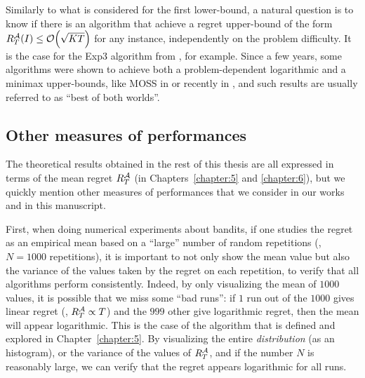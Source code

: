 Similarly to what is considered for the first lower-bound,
a natural question is to know if there is an algorithm that achieve a regret upper-bound of the form $R_T^{\mathcal{A}}(I) \leq \mathop{}\mathopen{}\mathcal{O}\mathopen{}\left(\sqrt{K T}\right)$ for any instance, independently on the problem difficulty.
It is the case for the Exp3 algorithm from \cite{Auer02}, for example.
Since a few years, some algorithms were shown to achieve both a problem-dependent logarithmic and a minimax upper-bounds,
like MOSS in \cite{Audibert2009minimax} or recently \KLUCBpp{} in \cite{Menard17},
and such results are usually referred to as ``best of both worlds''.





\subsection{Other measures of performances}
\label{sub:2:otherMeasuresPerformance}

The theoretical results obtained in the rest of this thesis are all expressed in terms of the mean regret $R_T^{\mathcal{A}}$ (in Chapters~\ref{chapter:5} and \ref{chapter:6}), but we quickly mention other measures of performances that we consider in our works and in this manuscript.

First, when doing numerical experiments about bandits, if one studies the regret as an empirical mean based on a ``large'' number of random repetitions (\eg, $N=1000$ repetitions), it is important to not only show the mean value but also the variance of the values taken by the regret on each repetition, to verify that all algorithms perform consistently.
Indeed, by only visualizing the mean of $1000$ values, it is possible that we miss some ``bad runs'': if $1$ run out of the $1000$ gives linear regret (\ie, $R_T^{\mathcal{A}} \propto T$) and the $999$ other give logarithmic regret, then the mean will appear logarithmic.
This is the case of the \Selfish{} algorithm that is defined and explored in Chapter~\ref{chapter:5}.
By visualizing the entire \emph{distribution} (as an histogram), or the variance of the values of $R_T^{\mathcal{A}}$, and if the number $N$ is reasonably large, we can verify that the regret appears logarithmic for all runs.

